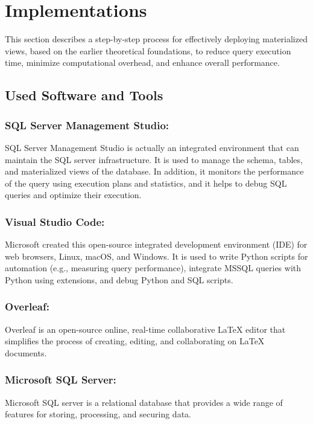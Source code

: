 \section{Implementations}
This section describes a step-by-step process for effectively deploying materialized views, based on the earlier theoretical foundations, to reduce query execution time, minimize computational overhead, and enhance overall performance.

\subsection{Used Software and Tools}
\subsubsection{SQL Server Management Studio:}SQL Server Management Studio is actually an integrated environment that can maintain the SQL server infrastructure. It is used to manage the schema, tables, and materialized views of the database. In addition, it monitors the performance of the query using execution plans and statistics, and it helps to debug SQL queries and optimize their execution.

\subsubsection{Visual Studio Code:} Microsoft created this open-source integrated development environment (IDE) for web browsers, Linux, macOS, and Windows. It is used to write Python scripts for automation (e.g., measuring query performance), integrate MSSQL queries with Python using extensions, and debug Python and SQL scripts.

\subsubsection{Overleaf:} Overleaf is an open-source online, real-time collaborative LaTeX editor that simplifies the process of creating, editing, and collaborating on LaTeX documents.

\subsubsection{Microsoft SQL Server:} Microsoft SQL server is a relational database that provides a wide range of features for storing, processing, and securing data.


